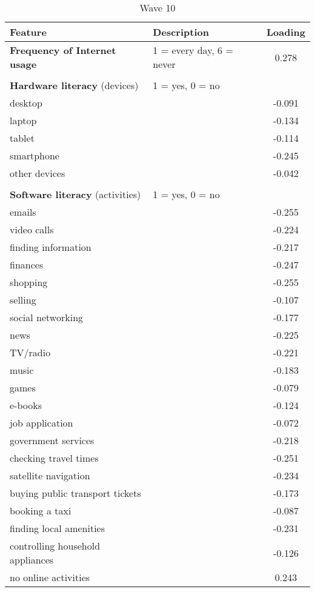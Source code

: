 \documentclass[12pt]{article}
\begin{document}
\begin{table}[h!]
        \begin{subtable}{\textwidth}
            \centering
            \caption{Wave 10}
            \begin{tabular}{llc}
                \toprule
                Feature & Description & Loading \\
                \midrule
                \textbf{Frequency of Internet usage} & 1 = every day, 6 = never & 0.278 \\
                & & \\
                \textbf{Hardware literacy} (devices) & 1 = yes, 0 = no & \\
                desktop &  & -0.091 \\
                laptop &  & -0.134 \\
                tablet &  & -0.114 \\
                smartphone &  & -0.245 \\
                other devices &  & -0.042 \\
                & & \\
                \textbf{Software literacy} (activities) & 1 = yes, 0 = no & \\
                emails &  & -0.255 \\
                video calls &  & -0.224 \\
                finding information &  & -0.217 \\
                finances &  & -0.247 \\
                shopping &  & -0.255 \\
                selling &  & -0.107 \\
                social networking &  & -0.177 \\
                news &  & -0.225 \\
                TV/radio &  & -0.221 \\
                music &  & -0.183 \\
                games &  & -0.079 \\
                e-books &  & -0.124 \\
                job application &  & -0.072 \\
                government services &  & -0.218 \\
                checking travel times &  & -0.251 \\
                satellite navigation &  & -0.234 \\
                buying public transport tickets &  & -0.173 \\
                booking a taxi &  & -0.087 \\
                finding local amenities &  & -0.231 \\
                controlling household appliances &  & -0.126 \\
                no online activities &  & 0.243 \\
                \bottomrule
            \end{tabular}
        \end{subtable}

    \end{table}
\end{document}
